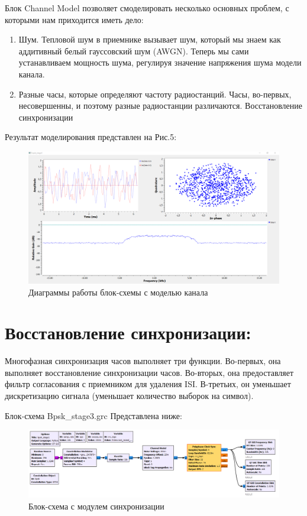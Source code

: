 \documentclass[12pt]{article}
\begin{document}
Блок Channel Model позволяет смоделировать несколько основных проблем, с которыми нам приходится иметь дело:

\begin{enumerate}
	\item Шум. Тепловой шум в приемнике вызывает шум, который мы знаем как аддитивный белый гауссовский шум (AWGN). Теперь мы сами устанавливаем мощность шума, регулируя значение напряжения шума модели канала. 
	\item Разные часы, которые определяют частоту радиостанций. Часы, во-первых, несовершенны, и поэтому разные радиостанции различаются. Восстановление синхронизации
\end{enumerate}

Результат моделирования представлен на Рис.5:

\begin{figure}[H]
    \centering
    \includegraphics[width=1\textwidth]{pics/a0000-img005.png}
    \caption{Диаграммы работы блок-схемы с моделью канала}
\end{figure}

\section{Восстановление синхронизации:}

Многофазная синхронизация часов выполняет три функции. Во-первых, она выполняет восстановление синхронизации часов. Во-вторых, она предоставляет фильтр согласования с приемником для удаления ISI. В-третьих, он уменьшает дискретизацию сигнала (уменьшает количество выборок на символ).

Блок-схема Bpsk\_stage3.grc Представлена ниже:

\begin{figure}[H]
    \centering
    \includegraphics[width=1\textwidth]{pics/a0000-img006.png}
    \caption{Блок-схема с модулем синхронизации}
\end{figure}
\end{document}
